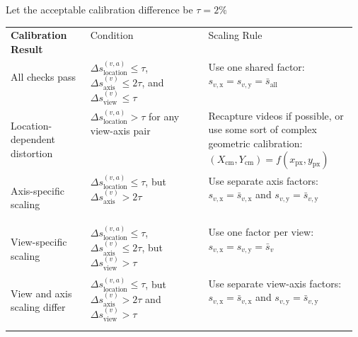 \documentclass[11pt]{article}
\renewcommand{\arraystretch}{1.26}
\let\almaToprule\toprule
\let\almaMidrule\midrule
\let\almaBottomrule\bottomrule
\renewcommand{\toprule}{\arrayrulecolor{almaBlue!58}\almaToprule\rowcolor{almaSky!78}}
\renewcommand{\midrule}{\arrayrulecolor{almaBlue!48}\almaMidrule}
\renewcommand{\bottomrule}{\arrayrulecolor{almaBlue!58}\almaBottomrule}
\renewcommand{\[}{%
  \par\smallskip\noindent
  \begin{center}%
  \setlength{\fboxsep}{5pt}%
  \setlength{\fboxrule}{0.35pt}%
  \begin{lrbox}{\almaEquationBox}%
  $\displaystyle
}
\renewcommand{\]}{%
  $%
  \end{lrbox}%
  \fcolorbox{equationLine}{equationBack}{\usebox{\almaEquationBox}}%
  \end{center}%
  \smallskip\par
}
\begin{document}
\begin{tcolorbox}[blue table box,title=\textbf{Calibration Consistency Interpretation}]
\small
\renewcommand{\arraystretch}{1.18}

Let the acceptable calibration difference be $\tau = 2\%$

\begin{tabularx}{\linewidth}{
>{\raggedright\arraybackslash\bfseries}p{0.23\linewidth}
>{\raggedright\arraybackslash}p{0.34\linewidth}
>{\raggedright\arraybackslash}X
}
\toprule
Calibration Result & Condition & Scaling Rule \\
\midrule

All checks pass
& $\Delta s_{\mathrm{location}}^{(v,a)} \leq \tau$, 
$\Delta s_{\mathrm{axis}}^{(v)} \leq 2\tau$, and 
$\Delta s_{\mathrm{view}}^{(v)} \leq \tau$
& Use one shared factor: 
$s_{v,\mathrm{x}} = s_{v,\mathrm{y}} = \bar{s}_{\mathrm{all}}$ \\

\midrule

Location-dependent distortion
& $\Delta s_{\mathrm{location}}^{(v,a)} > \tau$ for any view-axis pair
& Recapture videos if possible, or use some sort of complex geometric calibration:
$(X_{\mathrm{cm}},Y_{\mathrm{cm}})=f(x_{\mathrm{px}},y_{\mathrm{px}})$ \\

\midrule

Axis-specific scaling
& $\Delta s_{\mathrm{location}}^{(v,a)} \leq \tau$, but 
$\Delta s_{\mathrm{axis}}^{(v)} > 2\tau$
& Use separate axis factors:
$s_{v,\mathrm{x}}=\bar{s}_{v,\mathrm{x}}$ and
$s_{v,\mathrm{y}}=\bar{s}_{v,\mathrm{y}}$ \\

\midrule

View-specific scaling
& $\Delta s_{\mathrm{location}}^{(v,a)} \leq \tau$, 
$\Delta s_{\mathrm{axis}}^{(v)} \leq 2\tau$, but 
$\Delta s_{\mathrm{view}}^{(v)} > \tau$
& Use one factor per view:
$s_{v,\mathrm{x}} = s_{v,\mathrm{y}} = \bar{s}_{v}$ \\

\midrule

View and axis scaling differ
& $\Delta s_{\mathrm{location}}^{(v,a)} \leq \tau$, but 
$\Delta s_{\mathrm{axis}}^{(v)} > 2\tau$ and 
$\Delta s_{\mathrm{view}}^{(v)} > \tau$
& Use separate view-axis factors:
$s_{v,\mathrm{x}}=\bar{s}_{v,\mathrm{x}}$ and
$s_{v,\mathrm{y}}=\bar{s}_{v,\mathrm{y}}$ \\

\bottomrule
\end{tabularx}
\end{tcolorbox}
\end{document}
